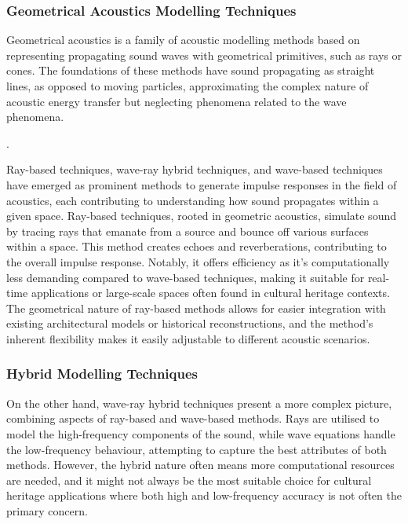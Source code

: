 \subsubsection{Geometrical Acoustics Modelling Techniques}\label{sec:bg-raytracing}
Geometrical acoustics is a family of acoustic modelling methods based on representing propagating sound waves with geometrical primitives, such as rays or cones. The foundations of these methods have sound propagating as straight lines, as opposed to moving particles, approximating the complex nature of acoustic energy transfer but neglecting phenomena related to the wave phenomena.

\citep{savioja2015overview}.

Ray-based techniques, wave-ray hybrid techniques, and wave-based techniques have emerged as prominent methods to generate impulse responses in the field of acoustics, each contributing to understanding how sound propagates within a given space. Ray-based techniques, rooted in geometric acoustics, simulate sound by tracing rays that emanate from a source and bounce off various surfaces within a space. This method creates echoes and reverberations, contributing to the overall impulse response. Notably, it offers efficiency as it's computationally less demanding compared to wave-based techniques, making it suitable for real-time applications or large-scale spaces often found in cultural heritage contexts. The geometrical nature of ray-based methods allows for easier integration with existing architectural models or historical reconstructions, and the method's inherent flexibility makes it easily adjustable to different acoustic scenarios. \cite{vorlander2008simulation}

\subsubsection{Hybrid Modelling Techniques}
On the other hand, wave-ray hybrid techniques present a more complex picture, combining aspects of ray-based and wave-based methods. Rays are utilised to model the high-frequency components of the sound, while wave equations handle the low-frequency behaviour, attempting to capture the best attributes of both methods. However, the hybrid nature often means more computational resources are needed, and it might not always be the most suitable choice for cultural heritage applications where both high and low-frequency accuracy is not often the primary concern. \cite{hulusic2012acoustic}

